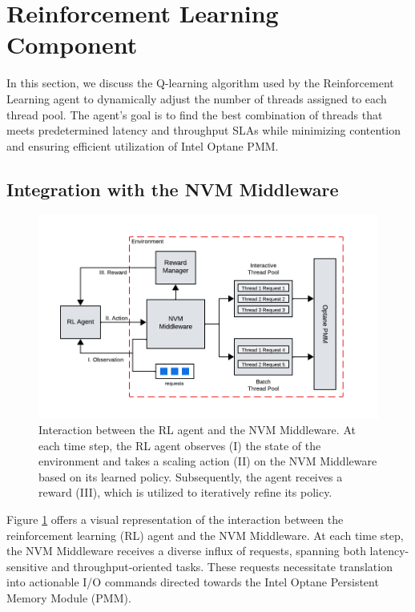 \section{Reinforcement Learning Component}

In this section, we discuss the Q-learning algorithm used by the Reinforcement Learning agent to dynamically adjust the number of threads assigned to each thread pool. The agent’s goal is to find the best combination of threads that meets predetermined latency and throughput SLAs while minimizing contention and ensuring efficient utilization of Intel Optane PMM. 

\subsection{Integration with the NVM Middleware}

\begin{figure}[ht]
  \centering
  \includegraphics[scale=1]{images/rl_workflow.png}
  \caption[Interaction between RL agent and NVM Middleware]{Interaction between the RL agent and the NVM Middleware. At each time step, the RL agent observes (I) the state of the environment and takes a scaling action (II) on the NVM Middleware based on its learned policy. Subsequently, the agent receives a reward (III), which is utilized to iteratively refine its policy.}
  \label{fig:rl_workflow}
\end{figure}

Figure \ref{fig:rl_workflow} offers a visual representation of the interaction between the reinforcement learning (RL) agent and the NVM Middleware. At each time step, the NVM Middleware receives a diverse influx of requests, spanning both latency-sensitive and throughput-oriented tasks. These requests necessitate translation into actionable I/O commands directed towards the Intel Optane Persistent Memory Module (PMM).

